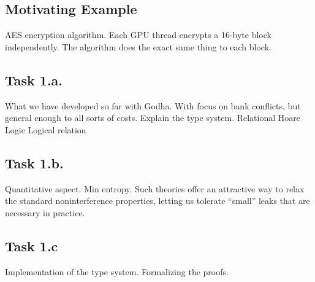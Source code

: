 \subsection{Motivating Example}
AES encryption algorithm. Each GPU thread encrypts a 16-byte block independently.
The algorithm does the exact same thing to each block.
\subsection{Task 1.a.} What we have developed so far with Godha.
With focus on bank conflicts, but general enough to all sorts of costs.
Explain the type system.
Relational Hoare Logic
Logical relation

\subsection{Task 1.b.} Quantitative aspect.
Min entropy.
Such theories offer an attractive way to relax the standard noninterference properties, letting us tolerate “small” leaks that are necessary in practice. 

\subsection{Task 1.c} Implementation of the type system.
Formalizing the proofs.